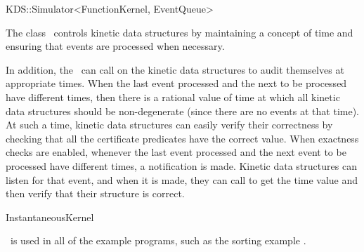 

\begin{ccRefClass}{KDS::Simulator<FunctionKernel, EventQueue>}  %


\ccDefinition
  
The class \ccRefName\ controls kinetic data structures by maintaining
a concept of time and ensuring that events are processed when
necessary. 

In addition, the \ccRefName\ can call on the kinetic data structures
to audit themselves at appropriate times. When the last event
processed and the next to be processed have different times, then
there is a rational value of time at which all kinetic data structures
should be non-degenerate (since there are no events at that time). At
such a time, kinetic data structures can easily verify their
correctness by checking that all the certificate predicates have the
correct value. When exactness checks are enabled, whenever the last
event processed and the next event to be processed have different
times, a
 notification is made. Kinetic
data structures can listen for that event, and when it is made, they
can call  to get the time value and
then verify that their structure is correct.


\ccIsModel

InstantaneousKernel



\ccCreation
{}  %


\ccExample

\ccRefName\ is used in all of the example programs, such as the sorting example
.



\end{ccRefClass}


